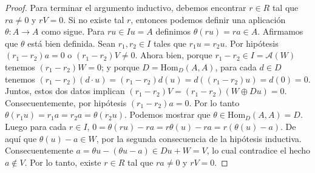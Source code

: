 \documentclass{report}
\newcommand{\Hom}{\text{Hom}}
\begin{document}
\begin{proof}
    Para terminar el argumento inductivo, debemos encontrar \(r \in R\) tal que \(r a \neq 0\) y \(r V = 0\).
    Si no existe tal \(r\), entonces podemos definir una aplicación \(\theta : A \rightarrow A\) como sigue.
    Para \(r u \in I u = A\) definimos \(\theta(r u) = r a \in A\).
    Afirmamos que \(\theta\) está bien definida.
    Sean \(r_1, r_2 \in I\) tales que \(r_1 u = r_2 u\).
    Por hipótesis \((r_1 - r_2) a = 0\) o \((r_1 - r_2) V \neq 0\).
    Ahora bien, porque \(r_1 - r_2 \in I = \mathcal{A}(W)\) tenemos \((r_1 - r_2) W = 0\);
    y porque \(D = \Hom_D(A, A)\), para cada \(d \in D\) tenemos \((r_1 - r_2) (d \cdot u) = (r_1 - r_2) d(u) = d((r_1 - r_2) u) = d(0) = 0\).
    Juntos, estos dos datos implican \((r_1 - r_2) V = (r_1 - r_2) (W \oplus D u) = 0\).
    Consecuentemente, por hipótesis \((r_1 - r_2) a = 0\).
    Por lo tanto \(\theta(r_1 u) = r_1 a = r_2 a = \theta(r_2 u)\).
    Podemos mostrar que \(\theta \in \Hom_D(A, A) = D\).
    Luego para cada \(r \in I\), \(0 = \theta(r u) - r a = r \theta(u) - r a = r(\theta(u) - a)\).
    De aquí que \(\theta(u) - a \in W\), por la segunda consecuencia de la hipótesis inductiva.
    Consecuentemente \(a = \theta u - (\theta u - a) \in D u + W = V\),
    lo cual contradice el hecho \(a \notin V\).
    Por lo tanto, existe \(r \in R\) tal que \(r a \neq 0\) y \(r V = 0\).
  \end{proof}
\end{document}
